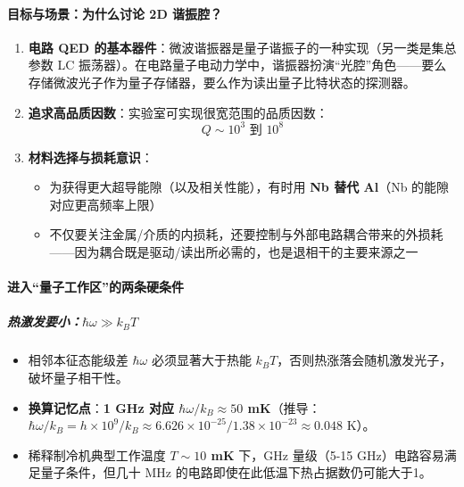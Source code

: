 \documentclass[12pt,a4paper,oneside]{ctexbook}
\providecommand{\tightlist}{%
  \setlength{\itemsep}{0pt}\setlength{\parskip}{0pt}}
\let\oldparagraph\paragraph
\renewcommand{\paragraph}[1]{\oldparagraph{#1}\mbox{}}
\let\oldsubparagraph\subparagraph
\renewcommand{\subparagraph}[1]{\oldsubparagraph{#1}\mbox{}}
\begin{document}
\paragraph{目标与场景：为什么讨论 2D
谐振腔？}\label{ux76eeux6807ux4e0eux573aux666fux4e3aux4ec0ux4e48ux8ba8ux8bba-2d-ux8c10ux632fux8154}

\begin{enumerate}
\def\labelenumi{\arabic{enumi})}
\item
  \textbf{电路 QED
  的基本器件}：微波谐振器是量子谐振子的一种实现（另一类是集总参数 LC
  振荡器）。在电路量子电动力学中，谐振器扮演``光腔''角色------要么存储微波光子作为量子存储器，要么作为读出量子比特状态的探测器。
\item
  \textbf{追求高品质因数}：实验室可实现很宽范围的品质因数：
  \[Q \sim 10^3 \text{ 到 } 10^8\]
\item
  \textbf{材料选择与损耗意识}：

  \begin{itemize}
  \tightlist
  \item
    为获得更大超导能隙（以及相关性能），有时用 \textbf{Nb 替代 Al}（Nb
    的能隙对应更高频率上限）
  \item
    不仅要关注金属/介质的内损耗，还要控制与外部电路耦合带来的外损耗------因为耦合既是驱动/读出所必需的，也是退相干的主要来源之一
  \end{itemize}
\end{enumerate}


\paragraph{
进入``量子工作区''的两条硬条件}\label{ux8fdbux5165ux91cfux5b50ux5de5ux4f5cux533aux7684ux4e24ux6761ux786cux6761ux4ef6}

\subparagraph{\texorpdfstring{
热激发要小：\(\hbar\omega \gg k_BT\)}{2.1 热激发要小：\textbackslash{}hbar\textbackslash{}omega \textbackslash{}gg k\_BT}}\label{ux70edux6fc0ux53d1ux8981ux5c0fhbaromega-gg-k_bt}

\begin{itemize}
\tightlist
\item
  相邻本征态能级差 \(\hbar\omega\) 必须显著大于热能
  \(k_BT\)，否则热涨落会随机激发光子，破坏量子相干性。
\item
  \textbf{换算记忆点}：\textbf{1 GHz 对应 \(\hbar\omega/k_B \approx 50\)
  mK}（推导：\(\hbar\omega/k_B = h\times 10^9 / k_B \approx 6.626\times10^{-25} / 1.38\times10^{-23} \approx 0.048\)
  K）。
\item
  稀释制冷机典型工作温度 \textbf{\(T\sim 10\) mK} 下，GHz 量级（5-15
  GHz）电路容易满足量子条件，但几十 MHz
  的电路即使在此低温下热占据数仍可能大于1。
\end{itemize}
\end{document}
